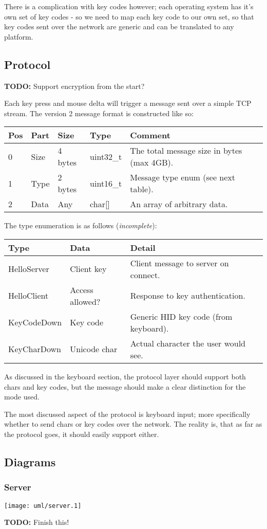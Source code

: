 There is a complication with key codes however; each operating system has it's
own set of key codes - so we need to map each key code to our own set, so that
key codes sent over the network are generic and can be translated to any 
platform.

\subsection{Protocol}

\textbf{TODO:} Support encryption from the start?

Each key press and mouse delta will trigger a message sent over a simple TCP 
stream. The version 2 message format is constructed like so:

\begin{tabular}{|l|l|l|l|l|}
\hline
\textbf{Pos} &
\textbf{Part} &
\textbf{Size} &
\textbf{Type} &
\textbf{Comment} \\
\hline
0 & Size & 4 bytes & uint32\_t & The total message size in bytes (max 4GB). \\
1 & Type & 2 bytes & uint16\_t & Message type enum (see next table). \\
2 & Data & Any & char[] & An array of arbitrary data. \\
\hline
\end{tabular}

The type enumeration is as follows (\textit{incomplete}):

\begin{tabular}{|l|l|l|}
\hline
\textbf{Type} &
\textbf{Data} &
\textbf{Detail} \\
\hline
HelloServer & Client key & Client message to server on connect. \\
HelloClient & Access allowed? & Response to key authentication. \\
KeyCodeDown & Key code & Generic HID key code (from keyboard). \\
KeyCharDown & Unicode char & Actual character the user would see. \\
\hline
\end{tabular}

As discussed in the keyboard section, the protocol layer should support both
chars and key codes, but the message should make a clear distinction for the
mode used.

The most discussed aspect of the protocol is keyboard input; more specifically
whether to send chars or key codes over the network. The reality is, that as far
as the protocol goes, it should easily support either.

\subsection{Diagrams}

\subsubsection{Server}

\texttt{[image: uml/server.1]}

\textbf{TODO:} Finish this!
